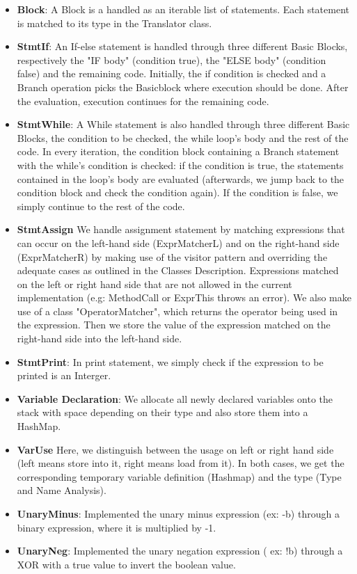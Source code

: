 \documentclass[paper=a4, fontsize=11pt]{scrartcl}
\numberwithin{equation}{section}		%
\numberwithin{figure}{section}			%
\numberwithin{table}{section}				%
\begin{document}
\begin{itemize}
	\item \textbf{Block}: A Block is a handled as an iterable list of statements. Each statement is matched to its type in the Translator class.
	\item \textbf{StmtIf}: An If-else statement is handled through three different Basic Blocks, respectively the "IF body" (condition true), the "ELSE body" (condition false) and the remaining code. Initially, the if condition is checked and a Branch operation picks the Basicblock where execution should be done. After the evaluation, execution continues for the remaining code. 
	\item \textbf{StmtWhile}: A While statement is also handled through three different Basic Blocks, the condition to be checked, the while loop's body and the rest of the code. In every iteration, the condition block containing a Branch statement with the while's condition  is checked: if the condition is true, the statements contained in the loop's body are evaluated (afterwards, we jump back to the condition block and check the condition again). If the condition is false, we simply continue to the rest of the code.
	\item \textbf{StmtAssign} We handle assignment statement by matching expressions that can occur on the left-hand side (ExprMatcherL) and on the right-hand side (ExprMatcherR) by making use of the visitor pattern and overriding the adequate cases as outlined in the Classes Description. Expressions matched on the left or right hand side that are not allowed in the current implementation (e.g: MethodCall or ExprThis throws an error). We also make use of a class "OperatorMatcher", which returns the operator being used in the expression. Then we store the value of the expression matched on the right-hand side into the left-hand side. 
	\item \textbf{StmtPrint}: In print statement, we simply check if the expression to be printed is an Interger.
	\item \textbf{Variable Declaration}: We allocate all newly declared variables onto the stack with space depending on their type and also store them into a HashMap.
	\item \textbf{VarUse} Here, we distinguish between the usage on left or right hand side (left means store into it, right means load from it). In both cases, we get the corresponding temporary variable definition (Hashmap) and the type (Type and Name Analysis). 
	\item \textbf{UnaryMinus}: Implemented the unary minus expression (ex: -b) through a binary expression, where it is multiplied by -1. 
	\item \textbf{UnaryNeg}: Implemented the unary negation expression ( ex: !b) through a XOR with a true value to invert the boolean value. 
\end{itemize}
\end{document}
